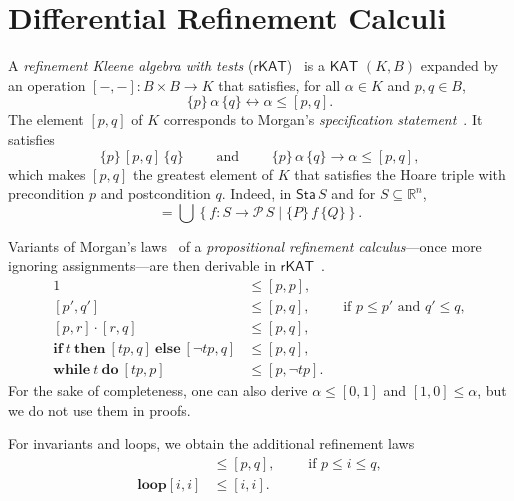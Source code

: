 \documentclass[envcountsame,envcountsect]{llncs}
\newcommand{\IF}[3]{\mathbf{if}\ #1\ \mathbf{then}\ #2\ \mathbf{else}\ #3}
\newcommand{\WHILE}[2]{\mathbf{while}\ #1\ \mathbf{do}\ #2}
\newcommand{\KAT}{\mathsf{KAT}}
\newcommand{\rKAT}{\mathsf{rKAT}}
\newcommand{\Pow}{\mathcal{P}}
\newcommand{\reals}{\mathbb{R}}
\newcommand{\sta}{\mathsf{Sta}}
\begin{document}

\section{Differential Refinement Calculi}\label{sec:refine}

A \emph{refinement Kleene algebra with tests}
($\rKAT$)~\cite{ArmstrongGS16}  is a $\KAT$
$(K,B)$ expanded by an operation $[-,-]:B\times B\to K$ that
satisfies, for all $\alpha \in K$ and $p,q\in B$, 
\begin{equation*}
  \{p\}\, \alpha\, \{q\} \leftrightarrow \alpha\le [p,q].
\end{equation*}
The element $[p,q]$ of $K$ corresponds to Morgan's \emph{specification
  statement}~\cite{Morgan94}. It satisfies
\begin{equation*}
  \{p\}\, [p,q]\, \{q\}\qquad \text{ and }\qquad \{p\}\, \alpha\, \{q\} \rightarrow \alpha\le [p,q],
\end{equation*}
which makes $[p,q]$ the greatest element of $K$ that satisfies the Hoare
triple with precondition $p$ and postcondition $q$.  Indeed, in
$\sta\, S$ and for $S\subseteq \reals^n$,
\begin{equation*}
  [P,Q] = \bigcup \left\{f:S\to \Pow\, S \mid \{P\}\, f\, \{Q\}\right\}.
\end{equation*}

Variants of Morgan's laws~\cite{Morgan94} of a \emph{propositional
  refinement calculus}---once more ignoring assignments---are then derivable in
$\rKAT$~\cite{ArmstrongGS16}.
\begin{align}
  1 &\le [p,p],\label{eq:r-skip}\tag{r-skip}\\
[p',q'] &\le [p,q],\qquad \text{ if } p\le p'\text{ and } q'\le q,\label{eq:r-cons}\tag{r-cons}\\
[p,r]\cdot [r,q] &\le [p,q],\label{eq:r-seq}\tag{r-seq}\\
\IF{t}{[tp,q]}{[\neg tp,q]} &\le [p,q],\label{eq:r-cond}\tag{r-cond}\\
 \WHILE{t}{[tp,p]} &\le [p,\neg tp]. \label{eq:r-while}\tag{r-while}
\end{align}
For the sake of completeness, one can also derive $\alpha \le [0,1]$ and $[1,0] \le \alpha$, but we do not use them in proofs.

For invariants and loops, we obtain the additional refinement laws
\begin{align}
  [i,i] &\le [p,q],\qquad \text{ if } p\le i \le q,\label{eq:r-inv}\tag{r-inv}\\
\mathbf{loop} [i,i] &\le [i,i]. \label{eq:r-loop}\tag{r-loop}
\end{align}
\end{document}
